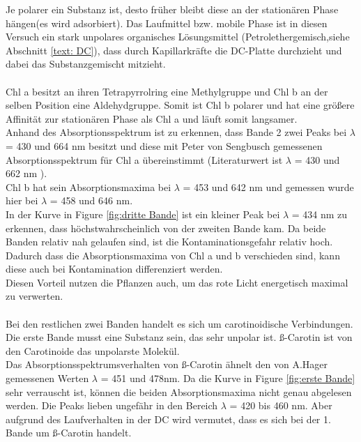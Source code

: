 \documentclass[10pt,a4paper]{article}
\begin{document}
			Je polarer ein Substanz ist, desto früher bleibt diese an der stationären Phase hängen(es wird adsorbiert). Das Laufmittel bzw. mobile Phase ist in diesen Versuch ein stark unpolares organisches Lösungsmittel (Petrolethergemisch,siehe Abschnitt \ref*{text: DC}), dass durch Kapillarkräfte die DC-Platte durchzieht und dabei das Substanzgemischt mitzieht.\\
			\\
			Chl a besitzt an ihren Tetrapyrrolring eine Methylgruppe und Chl b an der selben Position eine Aldehydgruppe. Somit ist Chl b polarer und hat eine größere Affinität zur stationären Phase als Chl a und läuft somit langsamer.\\
			Anhand des Absorptionsspektrum ist zu erkennen, dass Bande 2 zwei Peaks bei $\lambda$ = 430 und 664 nm besitzt und diese mit Peter von Sengbusch gemessenen Absorptionsspektrum für Chl a übereinstimmt (Literaturwert ist $\lambda$ = 430 und 662 nm\cite{Absorption_Maxima_Chlorophylle} ).\\
			Chl b hat sein Absorptionsmaxima bei $\lambda$ = 453 und 642 nm\cite{Absorption_Maxima_Chlorophylle} und gemessen wurde hier bei $\lambda$ = 458 und 646 nm.\\ 
			In der Kurve in Figure \ref{fig:dritte Bande} ist ein kleiner Peak bei $\lambda$ = 434 nm zu erkennen, dass höchstwahrscheinlich von der zweiten Bande kam. Da beide Banden relativ nah gelaufen sind, ist die Kontaminationsgefahr relativ hoch.\\
			Dadurch dass die Absorptionsmaxima von Chl a und b verschieden sind, kann diese auch bei Kontamination differenziert werden.\\
			Diesen Vorteil nutzen die Pflanzen auch, um das rote Licht energetisch maximal zu verwerten.\\
			\\
			Bei den restlichen zwei Banden handelt es sich um carotinoidische Verbindungen.
			Die erste Bande musst eine Substanz sein, das sehr unpolar ist. ß-Carotin ist von den Carotinoide das unpolarste Molekül.\\
			Das Absorptionsspektrumsverhalten von ß-Carotin ähnelt den von A.Hager gemessenen Werten $\lambda$ = 451 und 478nm\cite{Absorption_Maxima_Carotinoide}. Da die Kurve in Figure \ref{fig:erste Bande} sehr verrauscht ist, können die beiden Absorptionsmaxima nicht genau abgelesen werden. Die Peaks lieben ungefähr in den Bereich $\lambda$ = 420 bis 460 nm. Aber aufgrund des Laufverhalten in der DC wird vermutet, dass es sich bei der 1. Bande um ß-Carotin handelt.\\
\end{document}
